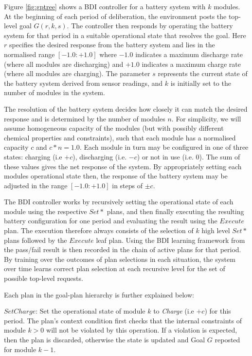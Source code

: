 Figure \ref{fig:gptree} shows a BDI controller for a battery system with $k$ modules. At the beginning of each period of deliberation, the environment posts the top-level goal $G(r,k,s)$. The controller then responds by operating the battery system for that period in a suitable operational state that resolves the goal. Here $r$ specifies the desired response from the battery system and lies in the normalised range $[-1.0:+1.0]$ where $-1.0$ indicates a maximum discharge rate (where all modules are discharging) and $+1.0$ indicates a maximum charge rate (where all modules are charging). The parameter $s$ represents the current state of the battery system derived from sensor readings, and $k$ is initially set to the number of modules in the system. 

The resolution of the battery system decides how closely it can match the desired response and is determined by the number of modules $n$. For simplicity, we will assume homogeneous capacity of the modules (but with possibly different chemical properties and constraints), such that each module has a normalised capacity $c$ and $c*n=1.0$. Each module in turn may be configured in one of three states: charging (i.e $+c$), discharging (i.e. $-c$) or not in use (i.e. $0$). The sum of these values gives the net response of the system. By appropriately setting each modules operational state then, the response of the battery system may be adjusted in the range $[-1.0:+1.0]$ in steps of $\pm c$.

The BDI controller works by recursively setting the operational state of each module using the respective $Set*$ plans, and then finally executing the resulting battery configuration for one period and evaluating the result using the $Execute$ plan. The execution therefore always consists of the selection of $k$ high level $Set*$ plans followed by the $Execute$ leaf plan. Using the BDI learning framework from \cite{Singh:RAS10} the pass/fail result is then recorded in the chain of active plans for that period. By training over the outcomes of plan selections in each situation, the system over time learns correct plan selection at each recursive level for the set of possible top-level requests. 

Each plan in the goal-plan hierarchy is further explained below:

$SetCharge$: Set the operational state of module $k$ to {\em Charge} (i.e $+c$) for this period. The plan's context condition first checks that the internal constraints of module $k>0$ will not be violated by this operation. If a violation is expected, then the plan is discarded, otherwise the state is updated and Goal $G$ reposted for module $k-1$.

